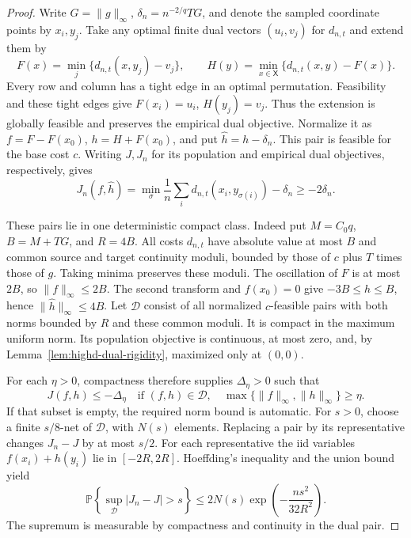 \documentclass[11pt,reqno]{amsart}
\theoremstyle{definition}
\theoremstyle{remark}
\numberwithin{equation}{section}
\newcommand{\Pp}{\mathbb P}
\begin{document}
\begin{proof}
Write \(G=\|g\|_\infty\), \(\delta_n=n^{-2/q}TG\),
and denote the sampled coordinate points by \(x_i,y_j\).
Take any optimal finite dual vectors \((u_i,v_j)\) for
\(d_{n,t}\) and extend them by
\[
F(x)=\min_j\{d_{n,t}(x,y_j)-v_j\},\qquad
H(y)=\min_{x\in\mathsf X}\{d_{n,t}(x,y)-F(x)\}.
\]
Every row and column has a tight edge in an optimal permutation.
Feasibility and these tight edges give
\(F(x_i)=u_i\), \(H(y_j)=v_j\). Thus the extension is
globally feasible and preserves the empirical dual objective.
Normalize it as \(f=F-F(x_0)\), \(h=H+F(x_0)\), and
put \(\widehat h=h-\delta_n\). This pair is feasible for
the base cost \(c\). Writing \(J,J_n\) for its population
and empirical dual objectives, respectively, gives
\begin{equation}
J_n(f,\widehat h)
 =\min_\sigma\frac1n\sum_i d_{n,t}(x_i,y_{\sigma(i)})
   -\delta_n\ge-2\delta_n.
\label{eq:highd-shifted-dual}
\end{equation}

These pairs lie in one deterministic compact class. Indeed put
\(M=C_0q\), \(B=M+TG\), and \(R=4B\). All costs
\(d_{n,t}\) have absolute value at most \(B\) and common
source and target continuity moduli, bounded by those of \(c\)
plus \(T\) times those of \(g\). Taking minima preserves
these moduli. The oscillation of \(F\) is at most \(2B\),
so \(\|f\|_\infty\le2B\). The second transform and
\(f(x_0)=0\) give \(-3B\le h\le B\), hence
\(\|\widehat h\|_\infty\le4B\).
Let \(\mathcal D\) consist of all normalized \(c\)-feasible
pairs with both norms bounded by \(R\) and these common
moduli. It is compact in the maximum uniform norm. Its population
objective is continuous, at most zero, and, by
Lemma~\ref{lem:highd-dual-rigidity}, maximized only at \((0,0)\).

For each \(\eta>0\), compactness therefore supplies
\(\Delta_\eta>0\) such that
\[
J(f,h)\le-\Delta_\eta
\quad\text{if }(f,h)\in\mathcal D,
\quad\max\{\|f\|_\infty,\|h\|_\infty\}\ge\eta.
\]
If that subset is empty, the required norm bound is automatic.
For \(s>0\), choose a finite \(s/8\)-net of
\(\mathcal D\), with \(N(s)\) elements. Replacing a pair
by its representative changes \(J_n-J\) by at most \(s/2\).
For each representative the iid variables
\(f(x_i)+h(y_i)\) lie in \([-2R,2R]\). Hoeffding's
inequality and the union bound yield
\begin{equation}
\Pp\!\left\{\sup_{\mathcal D}|J_n-J|>s\right\}
 \le2N(s)\exp\!\left(-\frac{ns^2}{32R^2}\right).
\label{eq:highd-dual-uniform-lln}
\end{equation}
The supremum is measurable by compactness and continuity in the
dual pair.


\end{proof}
\end{document}
